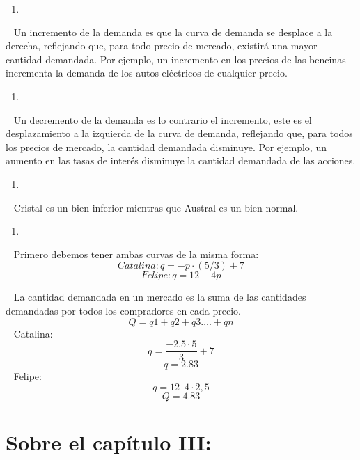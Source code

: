\documentclass[
  letterpaper,
  DIV=11,
  numbers=noendperiod]{scrreport}
\providecommand{\tightlist}{%
  \setlength{\itemsep}{0pt}\setlength{\parskip}{0pt}}\usepackage{longtable,booktabs,array}
\begin{document}
\begin{enumerate}
\def\labelenumi{\alph{enumi})}
\setcounter{enumi}{2}
\tightlist
\item
\end{enumerate}

~ Un incremento de la demanda es que la curva de demanda se desplace a
la derecha, reflejando que, para todo precio de mercado, existirá una
mayor cantidad demandada. Por ejemplo, un incremento en los precios de
las bencinas incrementa la demanda de los autos eléctricos de cualquier
precio.

\begin{enumerate}
\def\labelenumi{\alph{enumi})}
\setcounter{enumi}{3}
\tightlist
\item
\end{enumerate}

~ Un decremento de la demanda es lo contrario el incremento, este es el
desplazamiento a la izquierda de la curva de demanda, reflejando que,
para todos los precios de mercado, la cantidad demandada disminuye. Por
ejemplo, un aumento en las tasas de interés disminuye la cantidad
demandada de las acciones.

\begin{enumerate}
\def\labelenumi{\alph{enumi})}
\setcounter{enumi}{4}
\tightlist
\item
\end{enumerate}

~ Cristal es un bien inferior mientras que Austral es un bien normal.

\begin{enumerate}
\def\labelenumi{\alph{enumi})}
\setcounter{enumi}{5}
\tightlist
\item
\end{enumerate}

~ Primero debemos tener ambas curvas de la misma forma:
\[Catalina: q = -p \cdot (5/3) + 7\] \[Felipe: q = 12 - 4p\]

~ La cantidad demandada en un mercado es la suma de las cantidades
demandadas por todos los compradores en cada precio.
\[Q = q1 + q2 + q3 …. +qn\] ~ Catalina:
\[q= \frac{-2.5 \cdot 5}{3} + 7\] \[q= 2.83\] ~ Felipe:
\[q = 12 – 4 \cdot 2,5\] \[Q =4.83\]

\hypertarget{sobre-el-capuxedtulo-iii}{%
\section{Sobre el capítulo III:}\label{sobre-el-capuxedtulo-iii}}
\end{document}
